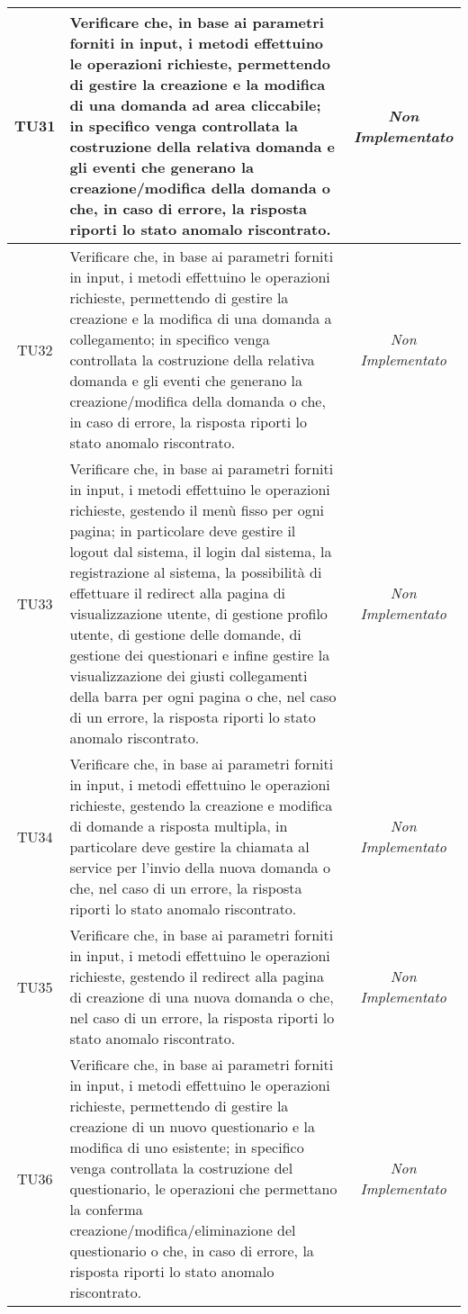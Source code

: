 \begin{longtable}{|c|>{}m{10cm}|c|}
\hypertarget{TU31}{TU31} & Verificare che, in base ai parametri forniti in input, i metodi effettuino le operazioni richieste, permettendo di gestire la creazione e la modifica di una domanda ad area cliccabile; in specifico venga controllata la costruzione della relativa domanda e gli eventi che generano la creazione/modifica della domanda  o che, in caso di errore, la risposta riporti lo stato anomalo riscontrato. & \textit{Non Implementato}\\ \hline
\hypertarget{TU32}{TU32} & Verificare che, in base ai parametri forniti in input, i metodi effettuino le operazioni richieste, permettendo di gestire la creazione e la modifica di una domanda a collegamento; in specifico venga controllata la costruzione della relativa domanda e gli eventi che generano la creazione/modifica della domanda o che, in caso di errore, la risposta riporti lo stato anomalo riscontrato. & \textit{Non Implementato}\\ \hline
\hypertarget{TU33}{TU33} & Verificare che, in base ai parametri forniti in input, i metodi effettuino le operazioni richieste, gestendo il menù fisso per ogni pagina; in particolare deve gestire il logout dal sistema, il login dal sistema, la registrazione al sistema, la possibilità di effettuare il redirect alla pagina di visualizzazione utente, di gestione profilo utente, di gestione delle domande, di gestione dei questionari e infine gestire la visualizzazione dei giusti collegamenti della barra per ogni pagina o che, nel caso di un errore, la risposta riporti lo stato anomalo riscontrato. & \textit{Non Implementato}\\ \hline
\hypertarget{TU34}{TU34} & Verificare che, in base ai parametri forniti in input, i metodi effettuino le operazioni richieste, gestendo la creazione e modifica di domande a risposta multipla, in particolare deve gestire la chiamata al service per l'invio della nuova domanda o che, nel caso di un errore, la risposta riporti lo stato anomalo riscontrato. & \textit{Non Implementato}\\ \hline
\hypertarget{TU35}{TU35} & Verificare che, in base ai parametri forniti in input, i metodi effettuino le operazioni richieste, gestendo il redirect alla pagina di creazione di una nuova domanda o che, nel caso di un errore, la risposta riporti lo stato anomalo riscontrato. & \textit{Non Implementato}\\ \hline
\hypertarget{TU36}{TU36} & Verificare che, in base ai parametri forniti in input, i metodi effettuino le operazioni richieste, permettendo di gestire la creazione di un nuovo questionario e la modifica di uno esistente; in specifico venga controllata la costruzione del questionario, le operazioni che permettano la conferma creazione/modifica/eliminazione del questionario o che, in caso di errore, la risposta riporti lo stato anomalo riscontrato. & \textit{Non Implementato}\\ \hline

\end{longtable}
